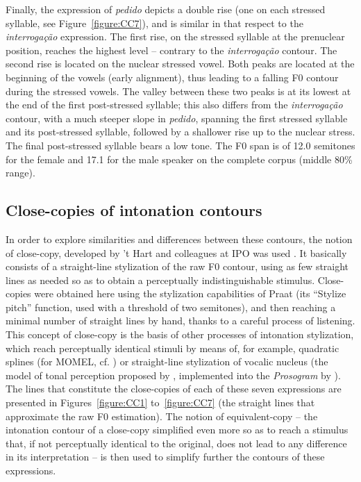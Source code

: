 \documentclass[output=paper]{LSP/langsci}
\begin{document}
Finally, the expression of \textit{pedido} depicts a double rise (one on each stressed syllable, see Figure~\ref{figure:CC7}), and is similar in that respect to the \textit{interrogação} expression. 
The first rise, on the stressed syllable at the prenuclear position, reaches the highest level -- contrary to the \textit{interrogação} contour. 
The second rise is located on the nuclear stressed vowel. 
Both peaks are located at the beginning of the vowels (early alignment), thus leading to a falling F0 contour during the stressed vowels. 
The valley between these two peaks is at its lowest at the end of the first post-stressed syllable; this also differs from the \textit{interrogação} contour, with a much steeper slope in \textit{pedido}, spanning the first stressed syllable and its post-stressed syllable, followed by a shallower rise up to the nuclear stress. 
The final post-stressed syllable bears a low tone. 
The F0 span is of 12.0 semitones for the female and 17.1 for the male speaker on the complete corpus (middle 80\% range).


\subsection{Close-copies of intonation contours}
\label{corpus:CC}

In order to explore similarities and differences between these contours, the notion of close-copy, developed by 't Hart and colleagues at IPO was used \citep{hart1991jasa}. 
It basically consists of a straight-line stylization of the raw F0 contour, using as few straight lines as needed so as to obtain a perceptually indistinguishable stimulus. 
Close-copies were obtained here using the stylization capabilities of Praat (its ``Stylize pitch'' function, used with a threshold of two semitones), and then reaching a minimal number of straight lines by hand, thanks to a careful process of listening. 
This concept of close-copy is the basis of other processes of intonation stylization, which reach perceptually identical stimuli by means of, for example, quadratic splines (for MOMEL, cf. \citealt{Hirst1993}) or straight-line stylization of vocalic nucleus (the model of tonal perception proposed by \citealt{dAlessandro1995tonal}, implemented into the \textit{Prosogram} by \citealt{mertens2004outil}). 
The lines that constitute the close-copies of each of these seven expressions are presented in Figures~\ref{figure:CC1} to~\ref{figure:CC7} (the straight lines that approximate the raw F0 estimation). 
The notion of equivalent-copy -- the intonation contour of a close-copy simplified even more so as to reach a stimulus that, if not perceptually identical to the original, does not lead to any difference in its interpretation -- is then used to simplify further the contours of these expressions.
\end{document}
